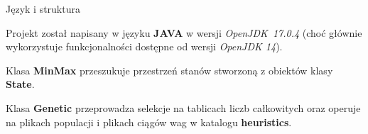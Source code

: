\begin{frame}{Język i struktura}

    \large
    Projekt został napisany w języku \textbf{JAVA} w wersji \textit{OpenJDK~17.0.4} (choć głównie wykorzystuje funkcjonalności dostępne od wersji \textit{OpenJDK 14}).
    
    Klasa \textbf{MinMax} przeszukuje przestrzeń stanów stworzoną z obiektów klasy \textbf{State}.

    Klasa \textbf{Genetic} przeprowadza selekcje na tablicach liczb całkowitych oraz operuje na plikach populacji i plikach ciągów wag w katalogu \textbf{heuristics}.





\end{frame}
